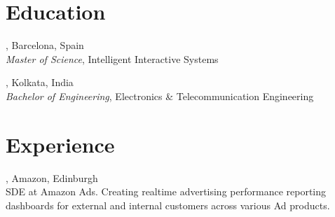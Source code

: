 \documentclass[mm]{simple_style}
\begin{document}
\address{Edinburgh, Scotland}


\begin{resume}

\section{Education}
, Barcelona, Spain \\
{\it Master of Science}, Intelligent Interactive Systems\\

\vspace{-4ex}

, Kolkata, India \\
{\it Bachelor of Engineering}, Electronics \& Telecommunication Engineering\\
\sectionline



\section{Experience}

, Amazon, Edinburgh  \\
SDE at Amazon Ads. Creating realtime advertising performance reporting dashboards for external and internal customers across various Ad products.\\

\vspace{-4.5ex}


\end{resume}
\end{document}
